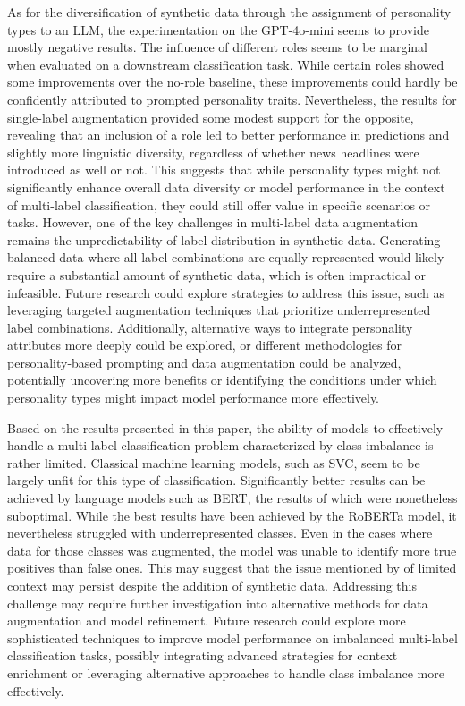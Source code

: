 \documentclass[manuscript]{clv3}
\begin{document}
As for the diversification of synthetic data through the assignment of personality types to an LLM, the experimentation on the GPT-4o-mini seems to provide mostly negative results. The influence of different roles seems to be marginal when evaluated on a downstream classification task. While certain roles showed some improvements over the no-role baseline, these improvements could hardly be confidently attributed to prompted personality traits. Nevertheless, the results for single-label augmentation provided some modest support for the opposite, revealing that an inclusion of a role led to better performance in predictions and slightly more linguistic diversity, regardless of whether news headlines were introduced as well or not. This suggests that while personality types might not significantly enhance overall data diversity or model performance in the context of multi-label classification, they could still offer value in specific scenarios or tasks. However, one of the key challenges in multi-label data augmentation remains the unpredictability of label distribution in synthetic data. Generating balanced data where all label combinations are equally represented would likely require a substantial amount of synthetic data, which is often impractical or infeasible. Future research could explore strategies to address this issue, such as leveraging targeted augmentation techniques that prioritize underrepresented label combinations. Additionally, alternative ways to integrate personality attributes more deeply could be explored, or different methodologies for personality-based prompting and data augmentation could be analyzed, potentially uncovering more benefits or identifying the conditions under which personality types might impact model performance more effectively.

Based on the results presented in this paper, the ability of models to effectively handle a multi-label classification problem characterized by class imbalance is rather limited. Classical machine learning models, such as SVC, seem to be largely unfit for this type of classification. Significantly better results can be achieved by language models such as BERT, the results of which were nonetheless suboptimal. While the best results have been achieved by the RoBERTa model, it nevertheless struggled with underrepresented classes. Even in the cases where data for those classes was augmented, the model was unable to identify more true positives than false ones. This may suggest that the issue mentioned by \citet{10.1016/j.eswa.2022.118534} of limited context may persist despite the addition of synthetic data. Addressing this challenge may require further investigation into alternative methods for data augmentation and model refinement. Future research could explore more sophisticated techniques to improve model performance on imbalanced multi-label classification tasks, possibly integrating advanced strategies for context enrichment or leveraging alternative approaches to handle class imbalance more effectively. 
\end{document}
